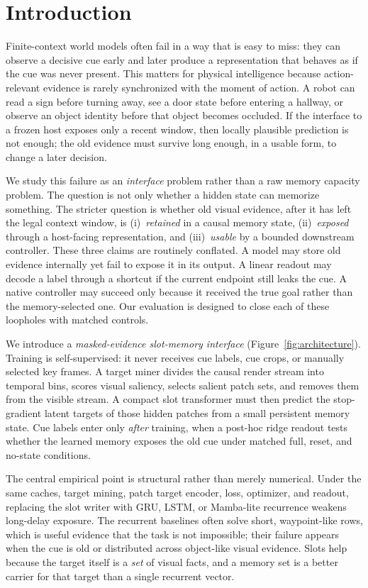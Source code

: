 \section{Introduction}

Finite-context world models often fail in a way that is easy to miss: they can
observe a decisive cue early and later produce a representation that behaves as
if the cue was never present.  This matters for physical intelligence because
action-relevant evidence is rarely synchronized with the moment of action.  A
robot can read a sign before turning away, see a door state before entering a
hallway, or observe an object identity before that object becomes occluded.  If
the interface to a frozen host exposes only a recent window, then locally
plausible prediction is not enough; the old evidence must survive long enough,
in a usable form, to change a later decision.

We study this failure as an \emph{interface} problem rather than a raw memory
capacity problem.  The question is not only whether a hidden state can memorize
something.  The stricter question is whether old visual evidence, after it has
left the legal context window, is (i)~\emph{retained} in a causal memory state,
(ii)~\emph{exposed} through a host-facing representation, and (iii)~\emph{usable}
by a bounded downstream controller.  These three claims are routinely conflated.
A model may store old evidence internally yet fail to expose it in its output.
A linear readout may decode a label through a shortcut if the current endpoint
still leaks the cue.  A native controller may succeed only because it received
the true goal rather than the memory-selected one.  Our evaluation is designed
to close each of these loopholes with matched controls.

We introduce a \emph{masked-evidence slot-memory interface}
(Figure~\ref{fig:architecture}).  Training is self-supervised: it never receives
cue labels, cue crops, or manually selected key frames.  A target miner divides
the causal render stream into temporal bins, scores visual saliency, selects
salient patch sets, and removes them from the visible stream.  A compact slot
transformer must then predict the stop-gradient latent targets of those hidden
patches from a small persistent memory state.  Cue labels enter only
\emph{after} training, when a post-hoc ridge readout tests whether the learned
memory exposes the old cue under matched full, reset, and no-state conditions.

The central empirical point is structural rather than merely numerical.  Under
the same caches, target mining, patch target encoder, loss, optimizer, and
readout, replacing the slot writer with GRU, LSTM, or Mamba-lite recurrence
weakens long-delay exposure.  The recurrent baselines often solve short,
waypoint-like rows, which is useful evidence that the task is not impossible;
their failure appears when the cue is old or distributed across object-like
visual evidence.  Slots help because the target itself is a \emph{set} of visual
facts, and a memory set is a better carrier for that target than a single
recurrent vector.

